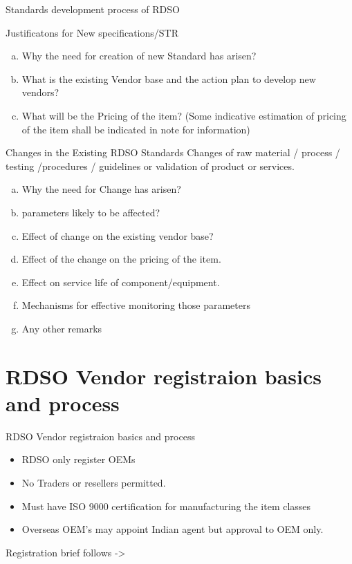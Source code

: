 \documentclass[
  10pt,
  ignorenonframetext,
  aspectratio=43,
]{beamer}
\providecommand{\tightlist}{%
  \setlength{\itemsep}{0pt}\setlength{\parskip}{0pt}}
\begin{document}
\begin{frame}{Standards development process of RDSO}
\protect\hypertarget{standards-development-process-of-rdso}{}
\begin{block}{Justificatons for New specifications/STR}
\protect\hypertarget{justificatons-for-new-specificationsstr}{}
\begin{enumerate}
[a)]
\tightlist
\item
  Why the need for creation of new Standard has arisen?
\item
  What is the existing Vendor base and the action plan to develop new
  vendors?
\item
  What will be the Pricing of the item? (Some indicative estimation of
  pricing of the item shall be indicated in note for information)
\end{enumerate}
\end{block}

\begin{block}{Changes in the Existing RDSO Standards}
\protect\hypertarget{changes-in-the-existing-rdso-standards}{}
Changes of raw material / process / testing /procedures / guidelines or
validation of product or services.

\begin{enumerate}
[a)]
\tightlist
\item
  Why the need for Change has arisen?
\item
  parameters likely to be affected?
\item
  Effect of change on the existing vendor base?
\item
  Effect of the change on the pricing of the item.
\item
  Effect on service life of component/equipment.
\item
  Mechanisms for effective monitoring those parameters
\item
  Any other remarks
\end{enumerate}
\end{block}
\end{frame}

\hypertarget{rdso-vendor-registraion-basics-and-process}{%
\section{RDSO Vendor registraion basics and
process}\label{rdso-vendor-registraion-basics-and-process}}

\begin{frame}{RDSO Vendor registraion basics and process}
\begin{itemize}
\item
  RDSO only register OEMs
\item
  No Traders or resellers permitted.
\item
  Must have ISO 9000 certification for manufacturing the item classes
\item
  Overseas OEM's may appoint Indian agent but approval to OEM only.
\end{itemize}

Registration brief follows -\textgreater{}
\end{frame}
\end{document}
